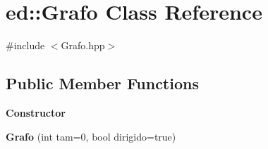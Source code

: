 \hypertarget{classed_1_1Grafo}{}\section{ed\+:\+:Grafo Class Reference}
\label{classed_1_1Grafo}


{\ttfamily \#include $<$Grafo.\+hpp$>$}

\subsection*{Public Member Functions}
\begin{Indent}{\bf Constructor}\par
\begin{DoxyCompactItemize}
\item 
{\bfseries Grafo} (int tam=0, bool dirigido=true)\hypertarget{classed_1_1Grafo_a9f9d0776db7767ea5ff92113ead337fb}{}\label{classed_1_1Grafo_a9f9d0776db7767ea5ff92113ead337fb}

\end{DoxyCompactItemize}
\end{Indent}
